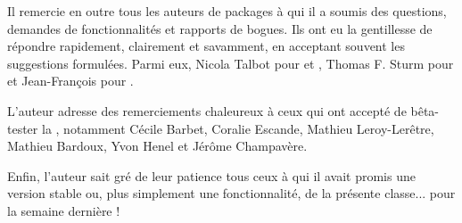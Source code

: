 Il remercie en outre tous les auteurs de packages à qui il a soumis  des questions, demandes de fonctionnalités et rapports
de bogues. Ils ont eu la gentillesse de répondre rapidement, clairement et
savamment, en acceptant souvent les suggestions formulées. Parmi eux, Nicola
Talbot pour  et , Thomas F. Sturm
pour  et Jean-François pour .

L'auteur adresse des remerciements chaleureux à ceux qui ont accepté de
bêta-tester la \yatCl{}, notamment Cécile Barbet, Coralie Escande, Mathieu
Leroy-Lerêtre, Mathieu Bardoux, Yvon Henel et Jérôme Champavère.

Enfin, l'auteur sait gré de leur patience tous ceux à qui il avait promis une
version stable ou, plus simplement une fonctionnalité, de la présente
classe... pour la semaine dernière !

